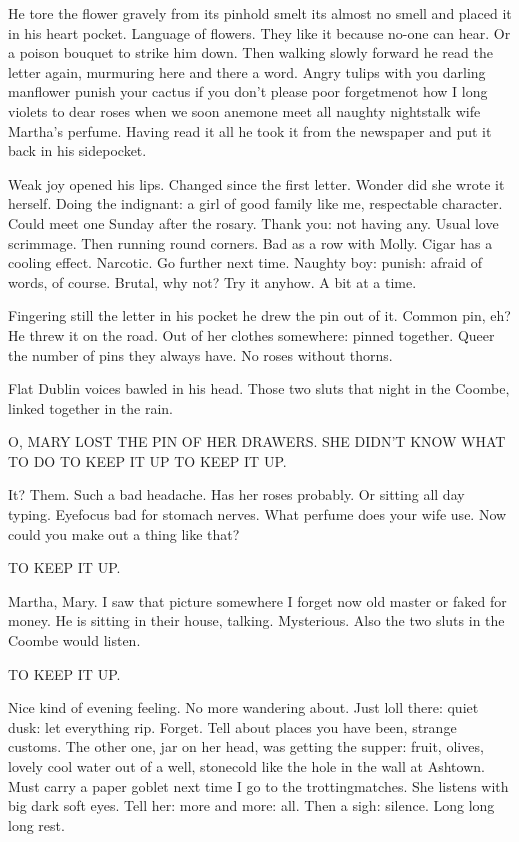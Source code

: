He tore the flower gravely from its pinhold smelt its almost no smell
and placed it in his heart pocket. Language of flowers. They like it
because no-one can hear. Or a poison bouquet to strike him down. Then
walking slowly forward he read the letter again, murmuring here and there
a word. Angry tulips with you darling manflower punish your cactus if you
don't please poor forgetmenot how I long violets to dear roses when we
soon anemone meet all naughty nightstalk wife Martha's perfume. Having
read it all he took it from the newspaper and put it back in his
sidepocket.

Weak joy opened his lips. Changed since the first letter. Wonder
did she wrote it herself. Doing the indignant: a girl of good
family like me, respectable character. Could meet one Sunday after the
rosary. Thank you: not having any. Usual love scrimmage. Then running
round corners. Bad as a row with Molly. Cigar has a cooling effect.
Narcotic. Go further next time. Naughty boy: punish: afraid of words, of
course. Brutal, why not? Try it anyhow. A bit at a time.

Fingering still the letter in his pocket he drew the pin out of it.
Common pin, eh? He threw it on the road. Out of her clothes somewhere:
pinned together. Queer the number of pins they always have. No roses
without thorns.

Flat Dublin voices bawled in his head. Those two sluts that night in
the Coombe, linked together in the rain.


    O, MARY LOST THE PIN OF HER DRAWERS.
    SHE DIDN'T KNOW WHAT TO DO
    TO KEEP IT UP
    TO KEEP IT UP.


It? Them. Such a bad headache. Has her roses probably. Or sitting all day
typing. Eyefocus bad for stomach nerves. What perfume does your wife
use. Now could you make out a thing like that?

    TO KEEP IT UP.

Martha, Mary. I saw that picture somewhere I forget now old master or
faked for money. He is sitting in their house, talking. Mysterious. Also
the two sluts in the Coombe would listen.

    TO KEEP IT UP.

Nice kind of evening feeling. No more wandering about. Just loll there:
quiet dusk: let everything rip. Forget. Tell about places you have been,
strange customs. The other one, jar on her head, was getting the supper:
fruit, olives, lovely cool water out of a well, stonecold like the hole in
the wall at Ashtown. Must carry a paper goblet next time I go to the
trottingmatches. She listens with big dark soft eyes. Tell her: more and
more: all. Then a sigh: silence. Long long long rest.

